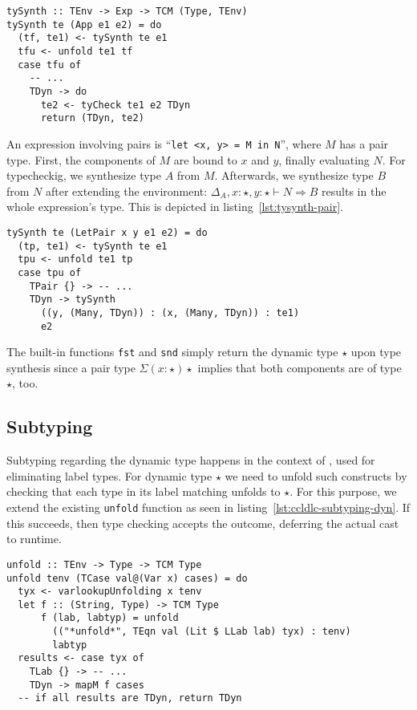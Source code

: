 \begin{lstlisting}[float,
	caption=Haskell: Application type synthesis (\texttt{TCTyping.hs}),
	label=lst:tysynth-application]
tySynth :: TEnv -> Exp -> TCM (Type, TEnv)
tySynth te (App e1 e2) = do
  (tf, te1) <- tySynth te e1
  tfu <- unfold te1 tf
  case tfu of
    -- ...
    TDyn -> do
      te2 <- tyCheck te1 e2 TDyn
      return (TDyn, te2)
\end{lstlisting}

An expression involving pairs is ``\lstinline[language=ldgv]!let <x, y> = M in N!'', where $M$ has a pair type. First, the components of $M$ are bound to $x$ and $y$, finally evaluating $N$. For typecheckig, we synthesize type $A$ from $M$. Afterwards, we synthesize type $B$ from $N$ after extending the environment: $\Delta_A, x:\star, y:\star \vdash N \Rightarrow B$ results in the whole expression's type. This is depicted in listing~\ref{lst:tysynth-pair}.

\begin{lstlisting}[float,
	caption=Haskell: Pair type synthesis (\texttt{TCTyping.hs}),
	label=lst:tysynth-pair]
tySynth te (LetPair x y e1 e2) = do
  (tp, te1) <- tySynth te e1
  tpu <- unfold te1 tp
  case tpu of
    TPair {} -> -- ...
    TDyn -> tySynth
      ((y, (Many, TDyn)) : (x, (Many, TDyn)) : te1)
      e2
\end{lstlisting}

The built-in functions \texttt{fst} and \texttt{snd} simply return the dynamic type $\star$ upon type synthesis since a pair type $\Sigma(x:\star)\star$ implies that both components are of type $\star$, too.

\subsection{Subtyping}

Subtyping regarding the dynamic type happens in the context of \case, used for eliminating label types. For dynamic type $\star$ we need to unfold such \case constructs by checking that each type in its label matching unfolds to $\star$. For this purpose, we extend the existing \texttt{unfold} function as seen in listing~\ref{lst:ccldlc-subtyping-dyn}. If this succeeds, then type checking accepts the outcome, deferring the actual cast to runtime.

\begin{lstlisting}[float,
	caption=Haskell: Unfolding to $\star$ in case terms (\texttt{TCSubtyping.hs}),
	label=lst:ccldlc-subtyping-dyn]
unfold :: TEnv -> Type -> TCM Type
unfold tenv (TCase val@(Var x) cases) = do
  tyx <- varlookupUnfolding x tenv
  let f :: (String, Type) -> TCM Type
      f (lab, labtyp) = unfold
        (("*unfold*", TEqn val (Lit $ LLab lab) tyx) : tenv)
        labtyp
  results <- case tyx of
    TLab {} -> -- ...
    TDyn -> mapM f cases
  -- if all results are TDyn, return TDyn
\end{lstlisting}

